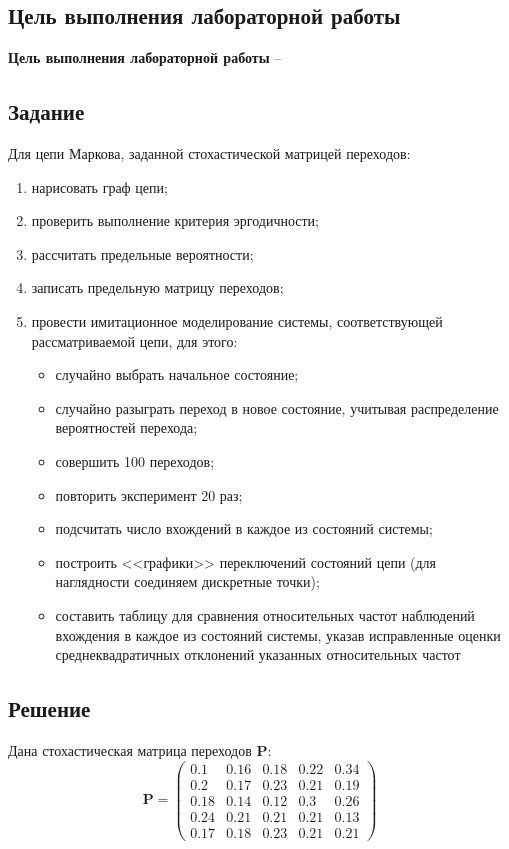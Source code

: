 \subsection{Цель выполнения лабораторной работы}\label{blockN.VariantM}
\textbf{Цель выполнения лабораторной работы }-- \GoalOfResearch

\subsection{Задание}
Для цепи Маркова, заданной стохастической матрицей переходов:
\begin{enumerate}
    \item нарисовать граф цепи;
    \item проверить выполнение критерия эргодичности;
    \item рассчитать предельные вероятности;
    \item записать предельную матрицу переходов;
    \item провести имитационное моделирование системы, соответствующей рассматриваемой цепи, для этого:
    \begin{itemize}
        \item случайно выбрать начальное состояние;
        \item случайно разыграть переход в новое состояние, учитывая распределение вероятностей перехода;
        \item совершить 100 переходов;
        \item повторить эксперимент 20 раз;
        \item подсчитать число вхождений в каждое из состояний системы;
        \item  построить <<графики>> переключений состояний цепи (для наглядности соединяем дискретные точки);
        \item составить таблицу для сравнения относительных частот наблюдений вхождения в каждое из состояний системы, указав исправленные оценки среднеквадратичных отклонений указанных относительных частот
    \end{itemize}
\end{enumerate}
\newpage
\subsection{Решение}
Дана стохастическая матрица переходов $\mathbf{P}$:
$$\mathbf{P}=\begin{pmatrix}
0.1 & 0.16 & 0.18 & 0.22 & 0.34 \\
0.2 & 0.17 & 0.23 & 0.21 & 0.19 \\
0.18 & 0.14 & 0.12 & 0.3 & 0.26 \\
0.24 & 0.21 & 0.21 & 0.21 & 0.13 \\
0.17 & 0.18 & 0.23 & 0.21 & 0.21
\end{pmatrix}$$

